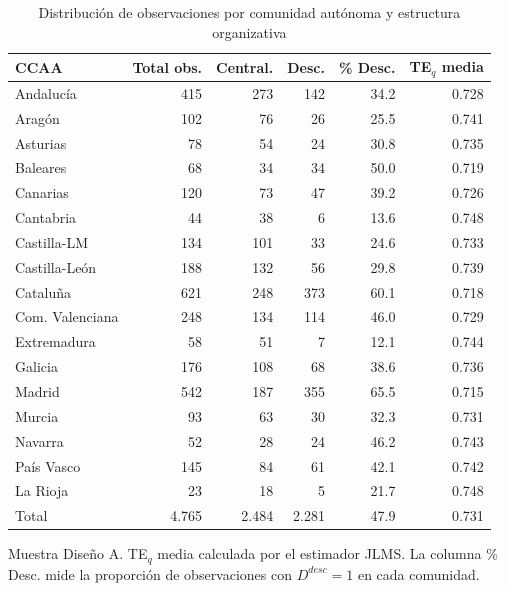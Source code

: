 \begin{table}[htbp]
\centering
\caption{Distribución de observaciones por comunidad autónoma y estructura organizativa}
\label{tab:distribucion_ccaa}
\begin{threeparttable}
\small
\begin{tabular}{lrrrrr}
\toprule
\textbf{CCAA} & \textbf{Total obs.} & \textbf{Central.} & \textbf{Desc.}
  & \textbf{\% Desc.} & \textbf{TE$_q$ media} \\
\midrule
Andalucía       & 415 & 273 & 142 & 34.2 & 0.728 \\
Aragón          & 102 & 76  & 26  & 25.5 & 0.741 \\
Asturias        & 78  & 54  & 24  & 30.8 & 0.735 \\
Baleares        & 68  & 34  & 34  & 50.0 & 0.719 \\
Canarias        & 120 & 73  & 47  & 39.2 & 0.726 \\
Cantabria       & 44  & 38  & 6   & 13.6 & 0.748 \\
Castilla-LM     & 134 & 101 & 33  & 24.6 & 0.733 \\
Castilla-León   & 188 & 132 & 56  & 29.8 & 0.739 \\
Cataluña        & 621 & 248 & 373 & 60.1 & 0.718 \\
Com. Valenciana & 248 & 134 & 114 & 46.0 & 0.729 \\
Extremadura     & 58  & 51  & 7   & 12.1 & 0.744 \\
Galicia         & 176 & 108 & 68  & 38.6 & 0.736 \\
Madrid          & 542 & 187 & 355 & 65.5 & 0.715 \\
Murcia          & 93  & 63  & 30  & 32.3 & 0.731 \\
Navarra         & 52  & 28  & 24  & 46.2 & 0.743 \\
País Vasco      & 145 & 84  & 61  & 42.1 & 0.742 \\
La Rioja        & 23  & 18  & 5   & 21.7 & 0.748 \\
\midrule
Total           & 4.765 & 2.484 & 2.281 & 47.9 & 0.731 \\
\bottomrule
\end{tabular}
\begin{tablenotes}
  \small
  \item Muestra Diseño A. TE$_q$ media calculada por el estimador JLMS. La columna \% Desc. mide la proporción de observaciones con $D^{desc}=1$ en cada comunidad.
\end{tablenotes}
\end{threeparttable}
\end{table}

